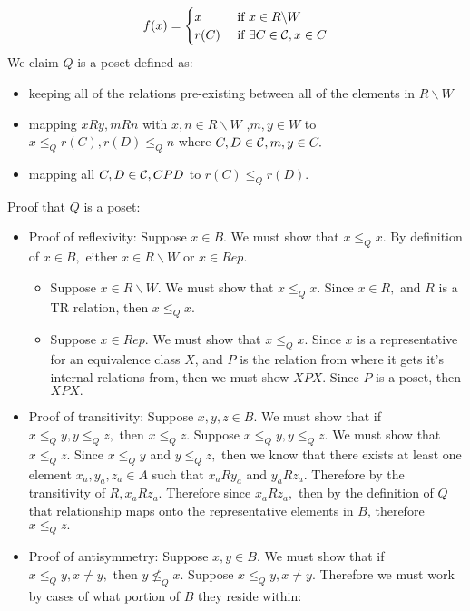 \documentclass[12pt, letterpaper]{article}
\begin{document}
\begin{itemize}
		\[ f(x) = \begin{cases}
		x & \text{ if } x \in R \backslash W\\
		r(C) & \text{ if } \exists C \in {\cal C}, x \in C\\
  \end{cases}
  \] We claim $Q$ is a poset defined as: \begin{itemize} %
  \item keeping all of the relations pre-existing between all of the elements in $R\backslash W$
  \item  mapping $xRy, mRn$ with $x,n \in R \backslash W$ ,$m,y \in W$ to $x \leq_Q r(C), r(D) \leq_Q n$ where $C,D \in {\cal C}, m,y \in C.$ 
  \item mapping all $C,D \in {\cal C}, CPD$ to $r(C) \leq_Q r(D).$
\end{itemize}    
	Proof that $Q$ is a poset:
	\begin{itemize}
		\item Proof of reflexivity:  Suppose $x \in B.$  We must show that $x \leq_Q x.$  By definition of $x \in B,$ either $x \in R \backslash W$ or $x \in Rep.$  \begin{itemize}
			\item Suppose $x \in R \backslash W.$  We must show that $x \leq_Q x.$  Since $x \in R,$ and $R$ is a TR relation, then $x \leq_Q x.$
			\item Suppose $x \in Rep.$  We must show  that $x \leq_Q x.$  Since $x$ is a representative for an equivalence class $X$, and $P$ is the relation from where it gets it's internal relations from, then we must show $XPX.$  Since $P$ is a poset, then $XPX.$ 
		\end{itemize}
		\item Proof of transitivity:  Suppose $x,y,z \in B.$  We must show that if $x \leq_Q y, y \leq_Q z,$ then $x \leq_Q z.$  Suppose  $x \leq_Q y, y \leq_Q z.$  We must show that $x \leq_Q z.$  Since $x \leq_Q y$ and $y \leq_Q z,$ then we know that there exists at least one element $x_a, y_a, z_a \in A$ such that $x_a R y_a$ and $y_a R z_a.$  Therefore by the transitivity of $R, x_a R z_a$.  Therefore since $x_a R z_a,$ then by the definition of $Q$ that relationship maps onto the representative elements in $B$, therefore $x \leq_Q z.$
		\item Proof of antisymmetry:  Suppose $x,y \in B.$  We must show that if $x \leq_Q y, x \neq y,$ then $y \nleq_Q x.$  Suppose $x \leq_Q y,x \neq y$.  Therefore we must work by cases of what portion of $B$ they reside within:

\end{itemize}
\end{itemize}
\end{document}
